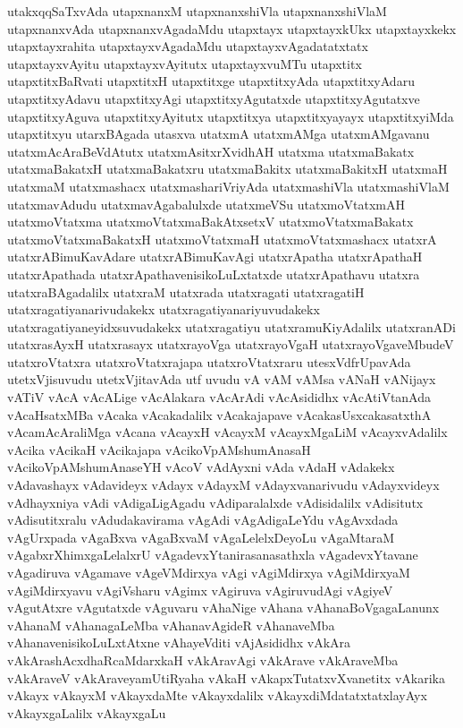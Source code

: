 {utakxqqSaTxvAda
utapxnanxM
utapxnanxshiVla
utapxnanxshiVlaM
utapxnanxvAda
utapxnanxvAgadaMdu
utapxtayx
utapxtayxkUkx
utapxtayxkekx
utapxtayxrahita
utapxtayxvAgadaMdu
utapxtayxvAgadatatxtatx
utapxtayxvAyitu
utapxtayxvAyitutx
utapxtayxvuMTu
utapxtitx
utapxtitxBaRvati
utapxtitxH
utapxtitxge
utapxtitxyAda
utapxtitxyAdaru
utapxtitxyAdavu
utapxtitxyAgi
utapxtitxyAgutatxde
utapxtitxyAgutatxve
utapxtitxyAguva
utapxtitxyAyitutx
utapxtitxya
utapxtitxyayayx
utapxtitxyiMda
utapxtitxyu
utarxBAgada
utasxva
utatxmA
utatxmAMga
utatxmAMgavanu
utatxmAcAraBeVdAtutx
utatxmAsitxrXvidhAH
utatxma
utatxmaBakatx
utatxmaBakatxH
utatxmaBakatxru
utatxmaBakitx
utatxmaBakitxH
utatxmaH
utatxmaM
utatxmashacx
utatxmashariVriyAda
utatxmashiVla
utatxmashiVlaM
utatxmavAdudu
utatxmavAgabalulxde
utatxmeVSu
utatxmoVtatxmAH
utatxmoVtatxma
utatxmoVtatxmaBakAtxsetxV
utatxmoVtatxmaBakatx
utatxmoVtatxmaBakatxH
utatxmoVtatxmaH
utatxmoVtatxmashacx
utatxrA
utatxrABimuKavAdare
utatxrABimuKavAgi
utatxrApatha
utatxrApathaH
utatxrApathada
utatxrApathavenisikoLuLxtatxde
utatxrApathavu
utatxra
utatxraBAgadalilx
utatxraM
utatxrada
utatxragati
utatxragatiH
utatxragatiyanarivudakekx
utatxragatiyanariyuvudakekx
utatxragatiyaneyidxsuvudakekx
utatxragatiyu
utatxramuKiyAdalilx
utatxranADi
utatxrasAyxH
utatxrasayx
utatxrayoVga
utatxrayoVgaH
utatxrayoVgaveMbudeV
utatxroVtatxra
utatxroVtatxrajapa
utatxroVtatxraru
utesxVdfrUpavAda
utetxVjisuvudu
utetxVjitavAda
utf
uvudu
vA
vAM
vAMsa
vANaH
vANijayx
vATiV
vAcA
vAcALige
vAcAlakara
vAcArAdi
vAcAsididhx
vAcAtiVtanAda
vAcaHsatxMBa
vAcaka
vAcakadalilx
vAcakajapave
vAcakasUsxcakasatxthA
vAcamAcAraliMga
vAcana
vAcayxH
vAcayxM
vAcayxMgaLiM
vAcayxvAdalilx
vAcika
vAcikaH
vAcikajapa
vAcikoVpAMshumAnasaH
vAcikoVpAMshumAnaseYH
vAcoV
vAdAyxni
vAda
vAdaH
vAdakekx
vAdavashayx
vAdavideyx
vAdayx
vAdayxM
vAdayxvanarivudu
vAdayxvideyx
vAdhayxniya
vAdi
vAdigaLigAgadu
vAdiparalalxde
vAdisidalilx
vAdisitutx
vAdisutitxralu
vAdudakavirama
vAgAdi
vAgAdigaLeYdu
vAgAvxdada
vAgUrxpada
vAgaBxva
vAgaBxvaM
vAgaLelelxDeyoLu
vAgaMtaraM
vAgabxrXhimxgaLelalxrU
vAgadevxYtanirasanasathxla
vAgadevxYtavane
vAgadiruva
vAgamave
vAgeVMdirxya
vAgi
vAgiMdirxya
vAgiMdirxyaM
vAgiMdirxyavu
vAgiVsharu
vAgimx
vAgiruva
vAgiruvudAgi
vAgiyeV
vAgutAtxre
vAgutatxde
vAguvaru
vAhaNige
vAhana
vAhanaBoVgagaLanunx
vAhanaM
vAhanagaLeMba
vAhanavAgideR
vAhanaveMba
vAhanavenisikoLuLxtAtxne
vAhayeVditi
vAjAsididhx
vAkAra
vAkArashAcxdhaRcaMdarxkaH
vAkAravAgi
vAkArave
vAkAraveMba
vAkAraveV
vAkAraveyamUtiRyaha
vAkaH
vAkapxTutatxvXvanetitx
vAkarika
vAkayx
vAkayxM
vAkayxdaMte
vAkayxdalilx
vAkayxdiMdatatxtatxlayAyx
vAkayxgaLalilx
vAkayxgaLu
}
